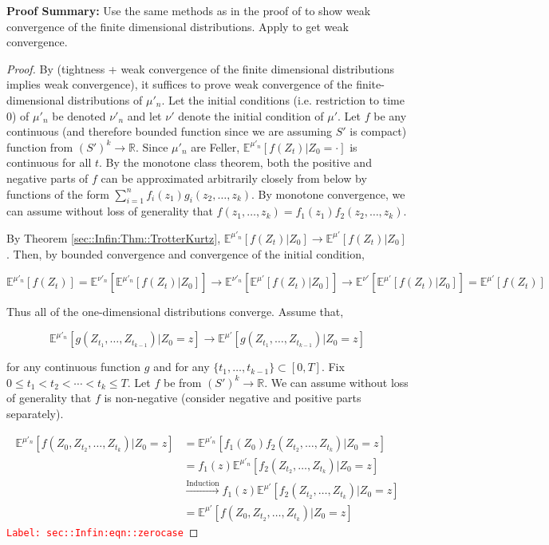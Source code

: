 \documentclass[12pt]{article}
\newcommand{\mb}{\mathbb}
\newcommand{\ra}{\rightarrow}
\newcommand{\os}{\overset}
\newcommand{\te}{\text}
\newcommand{\tr}{\textcolor{red}}
\newcommand{\labe}[1]{\tr{\texttt{Label: #1}}}
\newcommand{\pfsum}{\textbf{Proof Summary: }}
\newcommand{\ind}{\hspace{24pt}}
\newcommand{\exmu}[2]{\mb{E}^{#1}\left[#2\right]}	%
\begin{document}
\pfsum Use the same methods as in the proof of \cite[Theorem 4.2]{Kur81} to show weak convergence of the finite dimensional distributions. Apply \cite[Theorem 13.1]{Bil99} to get weak convergence.

\begin{proof}
By \cite[Theorem 13.1]{Bil99} (tightness + weak convergence of the finite dimensional distributions implies weak convergence), it suffices to prove weak convergence of the finite-dimensional distributions of \(\mu'_n\). Let the initial conditions (i.e. restriction to time 0) of \(\mu'_n\) be denoted \(\nu'_n\) and let \(\nu'\) denote the initial condition of \(\mu'\). Let \(f\) be any continuous (and therefore bounded function since we are assuming \(S'\) is compact) function from \((S')^k\ra\mb{R}\). Since \(\mu'_n\) are Feller, \(\exmu{\mu'_n}{f(Z_t)|Z_0 = \cdot}\) is continuous for all \(t\). By the monotone class theorem, both the positive and negative parts of \(f\) can be approximated arbitrarily closely from below by functions of the form \(\sum_{i=1}^n f_i(z_1)g_i(z_2,\dots,z_k)\). By monotone convergence, we can assume without loss of generality that \(f(z_1,\dots,z_k) = f_1(z_1)f_2(z_2,\dots,z_k)\).

\ind By Theorem \ref{sec::Infin:Thm::TrotterKurtz}, \(\exmu{\mu'_n}{f(Z_t)|Z_0} \ra \exmu{\mu'}{f(Z_t)|Z_0}\). Then, by bounded convergence and convergence of the initial condition,

\[\exmu{\mu'_n}{f(Z_t)}  = \exmu{\nu'_n}{\exmu{\mu'_n}{f(Z_t)|Z_0}} \ra \exmu{\nu'_n}{\exmu{\mu'}{f(Z_t)|Z_0}} \ra \exmu{\nu'}{\exmu{\mu'}{f(Z_t)|Z_0}} = \exmu{\mu'}{f(Z_t)}\]

Thus all of the one-dimensional distributions converge. Assume that,

\[\exmu{\mu'_n}{g(Z_{t_1},\dots,Z_{t_{k-1}})|Z_0=z} \ra \exmu{\mu'}{g(Z_{t_1},\dots,Z_{t_{k-1}})|Z_0=z}\]

\noindent for any continuous function \(g\) and for any \(\{t_1,\dots,t_{k-1}\} \subset [0,T]\). Fix \(0\leq t_1 <t_2 <\cdots < t_k\leq T\). Let \(f\) be from \((S')^k \ra \mb{R}\). We can assume without loss of generality that \(f\) is non-negative (consider negative and positive parts separately).

\begin{align}
\exmu{\mu'_n}{f(Z_{0},Z_{t_2},\dots,Z_{t_k})|Z_0 = z}&= \exmu{\mu'_n}{f_1(Z_{0})f_2(Z_{t_2},\dots,Z_{t_{k}})|Z_0=z}\nonumber\\
&= f_1(z)\exmu{\mu'_n}{f_2(Z_{t_2},\dots,Z_{t_{k}})|Z_0=z}\nonumber\\
&\os{\te{Induction}}{\ra} f_1(z)\exmu{\mu'}{f_2(Z_{t_2},\dots,Z_{t_{k}})|Z_0=z}\nonumber\\
&= \exmu{\mu'}{f(Z_0,Z_{t_2},\dots,Z_{t_k})|Z_0=z}
\label{sec::Infin:eqn::zerocase}
\end{align}
\labe{sec::Infin:eqn::zerocase}


\end{proof}
\end{document}
